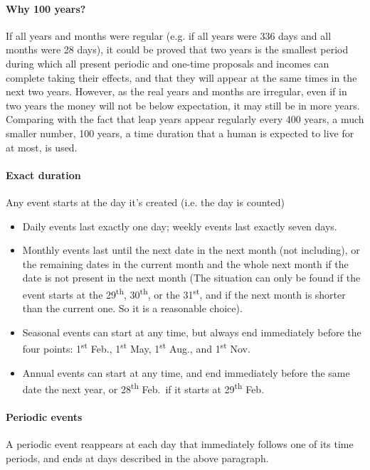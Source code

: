 \paragraph{Why 100 years?} If all years and months were regular (e.g. if all years were 336 days and all months were 28 days), it could be proved that two years is the smallest period during which all present periodic and one-time proposals and incomes can complete taking their effects, and that they will appear at the same times in the next two years. However, as the real years and months are irregular, even if in two years the money will not be below expectation, it may still be in more years. Comparing with the fact that leap years appear regularly every 400 years, a much smaller number, 100 years, a time duration that a human is expected to live for at most, is used.

\paragraph{Exact duration}
Any event starts at the day it's created (i.e. the day is counted)
\begin{itemize}
	\item Daily events last exactly one day; weekly events last exactly seven days.
	\item Monthly events last until the next date in the next month (not including), or the remaining dates in the current month and the whole next month if the date is not present in the next month (The situation can only be found if the event starts at the 29\textsuperscript{th}, 30\textsuperscript{th}, or the 31\textsuperscript{st}, and if the next month is shorter than the current one. So it is a reasonable choice).
	\item Seasonal events can start at any time, but always end immediately before the four points: 1\textsuperscript{st} Feb., 1\textsuperscript{st} May, 1\textsuperscript{st} Aug., and 1\textsuperscript{st} Nov.
	\item Annual events can start at any time, and end immediately before the same date the next year, or 28\textsuperscript{th} Feb.~if it starts at 29\textsuperscript{th} Feb.
\end{itemize}

\paragraph{Periodic events}
A periodic event reappears at each day that immediately follows one of its time periods, and ends at days described in the above paragraph.

